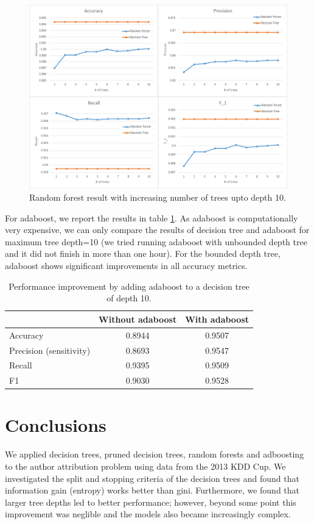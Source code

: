 \documentclass[letterpaper,12pt]{article}
\begin{document}
\begin{figure}[ht!]
\includegraphics[width=\textwidth]{RF_Bounded.png}
\caption{Random forest result with increasing number of trees upto depth 10.}\label{fig:randomforestbounded}
\end{figure}

For adaboost, we report the results in table \ref{table:adaboost}. As adaboost is computationally very expensive, we can only compare the results of decision tree and adaboost for maximum tree depth=10 (we tried running adaboost with unbounded depth tree and it did not finish in more than one hour). For the bounded depth tree, adaboost shows significant improvements in all accuracy metrics. 

\begin{table}[ht!]
\centering
\caption{Performance improvement by adding adaboost to a decision tree of depth 10. }\label{table:adaboost}

\begin{tabular}{|l|c|c|}
\hline
& Without adaboost & With adaboost\\\hline
Accuracy & 0.8944 & 0.9507\\\hline
Precision (sensitivity) & 0.8693 &  0.9547\\\hline
Recall & 0.9395 & 0.9509\\\hline
F1 & 0.9030 & 0.9528\\\hline
\end{tabular}
\end{table}
\section{Conclusions}
We applied decision trees, pruned decision trees, random forests and adboosting to the author attribution problem using data from the 2013 KDD Cup. We investigated the split and stopping criteria of the decision trees and found that information gain (entropy) works better than gini. Furthermore, we found that larger tree depths led to better performance; however, beyond some point this improvement was neglible and the models also became increasingly complex.
\end{document}
